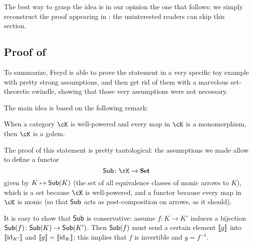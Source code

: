 \documentclass[a4paper,10pt,draft]{amsart}
\begin{document}
The best way to grasp the idea is in our opinion the one that follows: we simply reconstruct the proof appearing in \cite{fconc}: the uninterested readers can skip this section.
\subsection{Proof of }
To summarize, Freyd is able to prove the statement in a very specific toy example with pretty strong assumptions, and then get rid of them with a marvelous set-theoretic swindle, showing that those very assumptions were not necessary.

The main idea is based on the following remark:
\begin{remark}
When a category $\cK$ is well-powered and every map in $\cK$ is a monomorphism, then $\cK$ is a golem.
\end{remark}
The proof of this statement is pretty tautological: the assumptions we made allow to define a functor
\[
\Sub \colon \cK \to \Set 
\]
given by $K\mapsto \textsf{Sub}(K)$ (the set of all equivalence classes of monic arrows to $K$), which is a set because $\cK$ is well-powered, and a functor because every map in $\cK$ is monic (so that $\textsf{Sub}$ acts as post-composition on arrows, as it should).

It is easy to show that $\textsf{Sub}$ is conservative: assume $f\colon K \to K'$ induces a bijection $\textsf{Sub}(f) \colon \textsf{Sub}(K) \to \textsf{Sub}(K')$. Then $\textsf{Sub}(f)$ must send a certain element $\llbracket g \rrbracket$ into $\llbracket \text{id}_{K'} \rrbracket$ and $\llbracket g \rrbracket=\llbracket \text{id}_K \rrbracket$; this implies that $f$ is invertible and $g=f^{-1}$.


\end{document}
